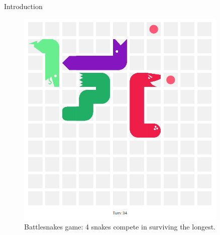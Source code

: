 \documentclass[final]{beamer}
\newlength{\sepwid}
\newlength{\onecolwid}
\newlength{\twocolwid}
\begin{document}
\begin{frame}[t]
\begin{columns}[t]
\begin{column}{\onecolwid}
\begin{block}{Introduction}
\end{block}


\begin{figure}
\includegraphics[width=1\linewidth]{battlesnake.png}
\caption{Battlesnakes game: 4 snakes compete in surviving the longest.	}
\end{figure}


\end{column} %

\begin{column}{\sepwid}\end{column} %

\begin{column}{\twocolwid} %

\begin{columns}[t,totalwidth=\twocolwid] %
			
\begin{column}{\onecolwid}\vspace{-.6in} %


\end{column}
\end{columns}
\end{column}
\end{columns}
\end{frame}
\end{document}
